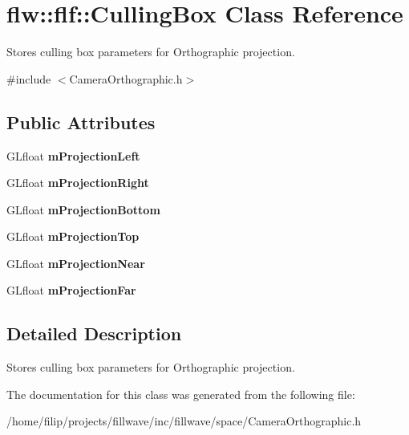 \hypertarget{structflw_1_1flf_1_1CullingBox}{}\section{flw\+:\+:flf\+:\+:Culling\+Box Class Reference}
\label{structflw_1_1flf_1_1CullingBox}


Stores culling box parameters for Orthographic projection.  




{\ttfamily \#include $<$Camera\+Orthographic.\+h$>$}

\subsection*{Public Attributes}
\begin{DoxyCompactItemize}
\item 
\mbox{\label{structflw_1_1flf_1_1CullingBox_ac5c2e8a66f067c2df77d106ca3581dff}} 
G\+Lfloat {\bfseries m\+Projection\+Left}
\item 
\mbox{\label{structflw_1_1flf_1_1CullingBox_a4da4f46dd3c7db0917ad2d7cfb898969}} 
G\+Lfloat {\bfseries m\+Projection\+Right}
\item 
\mbox{\label{structflw_1_1flf_1_1CullingBox_a023494058764b2e32487c74ca6f0ca5a}} 
G\+Lfloat {\bfseries m\+Projection\+Bottom}
\item 
\mbox{\label{structflw_1_1flf_1_1CullingBox_a00c8442039df52349d7270b380fa6107}} 
G\+Lfloat {\bfseries m\+Projection\+Top}
\item 
\mbox{\label{structflw_1_1flf_1_1CullingBox_a83129de939fbe7d4dd1cb53d3d6a05ed}} 
G\+Lfloat {\bfseries m\+Projection\+Near}
\item 
\mbox{\label{structflw_1_1flf_1_1CullingBox_a23e77401e6e69cdc66985ae21ddf4251}} 
G\+Lfloat {\bfseries m\+Projection\+Far}
\end{DoxyCompactItemize}


\subsection{Detailed Description}
Stores culling box parameters for Orthographic projection. 

The documentation for this class was generated from the following file\+:\begin{DoxyCompactItemize}
\item 
/home/filip/projects/fillwave/inc/fillwave/space/Camera\+Orthographic.\+h\end{DoxyCompactItemize}
